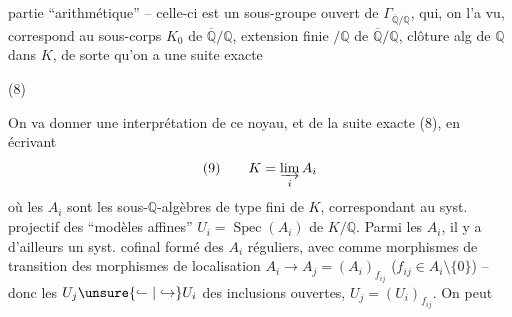 partie ``arithmétique'' -- celle-ci est un sous-groupe ouvert de $\Gamma_{\overline{\mathbb Q}/\mathbb Q}$, qui, on l'a vu, correspond au sous-corps $K_0$ de $\overline{\mathbb Q}/\mathbb Q$,  extension finie $/\mathbb Q$ de $\overline{\mathbb Q}/\mathbb Q$, clôture alg de $\mathbb Q$ dans $K$, de sorte qu'on a une suite exacte

\noindent (8)\quad{}

On va donner une interprétation de ce noyau, et de la suite exacte (8), en écrivant
\[
(9)\qquad K=\varinjlim_i A_i
\]
où les $A_i$ sont les sous-$\mathbb Q$-algèbres de type fini de $K$, correspondant au syst. projectif des ``modèles affines'' $U_i=\operatorname{Spec}(A_i)$ de $K/\mathbb Q$. Parmi les $A_i$, il y a d'ailleurs un syst. cofinal formé des $A_i$ réguliers,  avec comme morphismes de transition des morphismes de localisation $A_i\longrightarrow A_j=(A_i)_{f_{ij}}$ ($f_{ij}\in A_i\setminus\{0\}$) -- donc les $U_j\unsure{\lhook\joinrel\relbar|\hookrightarrow}U_i$ des inclusions ouvertes, $U_j=(U_i)_{f_{ij}}$. On peut
